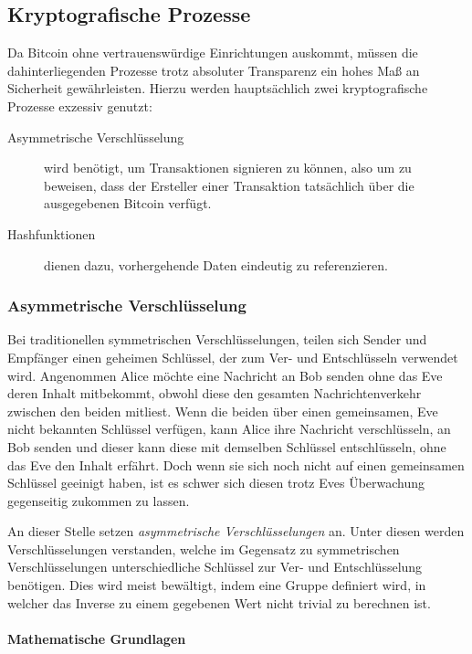 \subsection{Kryptografische Prozesse}

Da Bitcoin ohne vertrauenswürdige Einrichtungen auskommt, müssen die dahinterliegenden Prozesse trotz absoluter Transparenz ein hohes Maß an Sicherheit gewährleisten.
Hierzu werden hauptsächlich zwei kryptografische Prozesse exzessiv genutzt:
\begin{description}
    \item[Asymmetrische Verschlüsselung] wird benötigt, um Transaktionen signieren zu können, also um zu beweisen, dass der Ersteller einer Transaktion tatsächlich über die ausgegebenen Bitcoin verfügt.
    \item[Hashfunktionen] dienen dazu, vorhergehende Daten eindeutig zu referenzieren.
\end{description}

\subsubsection{Asymmetrische Verschlüsselung}

Bei traditionellen symmetrischen Verschlüsselungen, teilen sich Sender und Empfänger einen geheimen Schlüssel, der zum Ver- und Entschlüsseln verwendet wird.
Angenommen Alice möchte eine Nachricht an Bob senden ohne das Eve deren Inhalt mitbekommt, obwohl diese den gesamten Nachrichtenverkehr zwischen den beiden mitliest.
Wenn die beiden über einen gemeinsamen, Eve nicht bekannten Schlüssel verfügen, kann Alice ihre Nachricht verschlüsseln, an Bob senden und dieser kann diese mit demselben Schlüssel entschlüsseln, ohne das Eve den Inhalt erfährt.
Doch wenn sie sich noch nicht auf einen gemeinsamen Schlüssel geeinigt haben, ist es schwer sich diesen trotz Eves Überwachung gegenseitig zukommen zu lassen.

An dieser Stelle setzen \emph{asymmetrische Verschlüsselungen} an.
Unter diesen werden Verschlüsselungen verstanden, welche im Gegensatz zu symmetrischen Verschlüsselungen unterschiedliche Schlüssel zur Ver- und Entschlüsselung benötigen.
Dies wird meist bewältigt, indem eine Gruppe definiert wird, in welcher das Inverse zu einem gegebenen Wert nicht trivial zu berechnen ist.

\paragraph{Mathematische Grundlagen}

